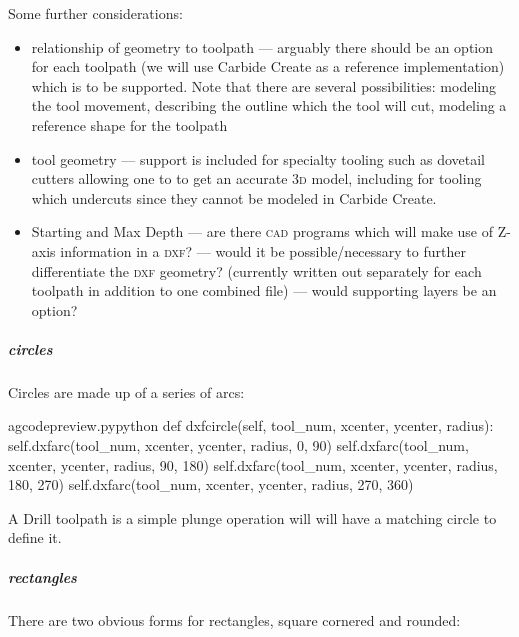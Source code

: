 \documentclass{ltxdoc}
\begin{document}
 
Some further considerations:

\begin{itemize}
 \item relationship of geometry to toolpath --- arguably there should be an option for each
       toolpath (we will use Carbide Create as a reference implementation) which is to be 
       supported. Note that there are several possibilities: modeling the tool movement, 
       describing the outline which the tool will cut, modeling a reference shape for the toolpath
 \item tool geometry --- support is included for specialty tooling 
       such as dovetail cutters allowing one to to get an accurate \textsc{3d} model, including for tooling which
       undercuts since they cannot be modeled in Carbide Create.
 \item Starting and Max Depth --- are there \textsc{cad} programs which will make use of Z-axis information 
       in a \textsc{dxf}? --- would it be possible/necessary to further differentiate the \textsc{dxf} geometry?
       (currently  written out separately for each toolpath in addition to one combined file) --- would supporting layers be an option?
\end{itemize}

\subparagraph{circles}

Circles are made up of a series of arcs:

\lstset{firstnumber=\thegcpy}
\begin{writecode}{a}{gcodepreview.py}{python}
    def dxfcircle(self, tool_num, xcenter, ycenter, radius):
        self.dxfarc(tool_num, xcenter, ycenter, radius,  0, 90)
        self.dxfarc(tool_num, xcenter, ycenter, radius, 90, 180)
        self.dxfarc(tool_num, xcenter, ycenter, radius, 180, 270)
        self.dxfarc(tool_num, xcenter, ycenter, radius, 270, 360)

\end{writecode}
\addtocounter{gcpy}{6}

A Drill toolpath is a simple plunge operation will will have a matching circle to define it.

\subparagraph{rectangles}

There are two obvious forms for rectangles, square cornered and rounded:
\end{document}
